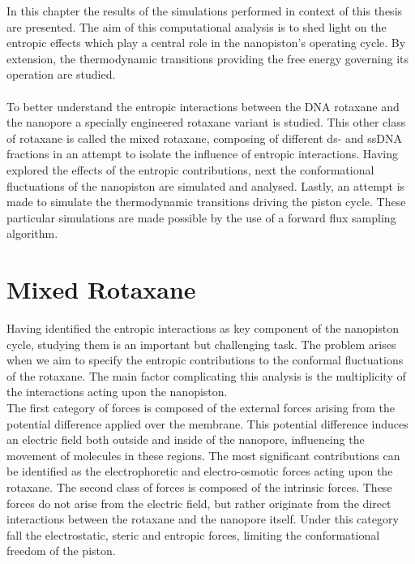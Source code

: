\vspace{2cm}
\noindent In this chapter the results of the simulations performed in context of this
thesis are presented. The aim of this computational analysis is to shed light on the
entropic effects which play a central role in the nanopiston's operating cycle. By
extension, the thermodynamic transitions providing the free energy governing its
operation are studied.\\\\
To better understand the entropic interactions between the DNA rotaxane and the nanopore
a specially engineered rotaxane variant is studied. This other class of rotaxane is
called the mixed rotaxane, composing of different ds- and ssDNA fractions in an attempt
to isolate the influence of entropic interactions. Having explored the effects of the
entropic contributions, next the conformational fluctuations of the nanopiston are
simulated and analysed. Lastly, an attempt is made to simulate the thermodynamic
transitions driving the piston cycle. These particular simulations are made possible
by the use of a forward flux sampling algorithm.

\newpage

\section{Mixed Rotaxane}

Having identified the entropic interactions as key component of the nanopiston cycle,
studying them is an important but challenging task. The problem arises when we aim to
specify the entropic contributions to the conformal fluctuations of the rotaxane. The
main factor complicating this analysis is the multiplicity of the interactions acting
upon the nanopiston.\\


The first category of forces is composed of the external forces arising from the
potential difference applied over the membrane. This potential difference induces an
electric field both outside and inside of the nanopore, influencing the movement of
molecules in these regions. The most significant contributions can be identified as the
electrophoretic and electro-osmotic forces acting upon the rotaxane. The second class of
forces is composed of the intrinsic forces. These forces do not arise from the
electric field, but rather originate from the direct interactions between the rotaxane
and the nanopore itself. Under this category fall the electrostatic, steric and entropic
forces, limiting the conformational freedom of the piston.



